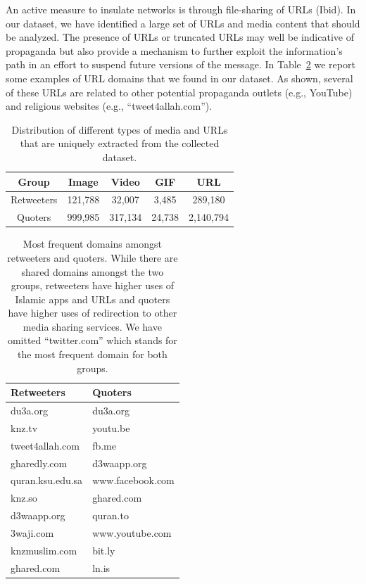 \documentclass[letterpaper]{article} %
\begin{document}
An active measure to insulate networks is through file-sharing of URLs (Ibid). In our  dataset, we have identified a large set of URLs and media content that should be analyzed. The presence of URLs or truncated URLs may well be indicative of propaganda but also provide a mechanism to further exploit the information's path in an effort to suspend future versions of the message.   In Table~\ref{table:urls} we report some examples of URL domains that we found in our dataset. As shown, several of these URLs are related to other potential propaganda outlets (e.g., YouTube) and religious websites (e.g., ``tweet4allah.com'').

\begin{table}[!htbp]
\centering
\begin{tabular}{|c||c|c|c|c|}
 \hline
 Group & Image & Video & GIF & URL \\ [0.5ex]
 \hline\hline
  \rule{0pt}{1ex} Retweeters & 121,788 & 32,007 & 3,485 & 289,180 \\\hline
 Quoters & 999,985 & 317,134 & 24,738 & 2,140,794 \\[0.25ex]\hline
\end{tabular}
\caption{Distribution of different types of media and URLs that are uniquely extracted from the collected dataset.}
\label{table:media-types}
\end{table}


\begin{table}[!h]
\centering
\begin{tabular}{|l||l|}
 \hline
 Retweeters & Quoters \\ [0.5ex]
 \hline\hline
  du3a.org & du3a.org\\
  knz.tv & youtu.be\\
  tweet4allah.com & fb.me\\
  gharedly.com & d3waapp.org\\
  quran.ksu.edu.sa & www.facebook.com\\
  knz.so & ghared.com\\
  d3waapp.org & quran.to\\
  3waji.com & www.youtube.com\\
  knzmuslim.com & bit.ly\\
  ghared.com & ln.is\\
  [0.25ex]\hline
\end{tabular}
\caption{Most frequent domains amongst retweeters and quoters. While there are shared domains amongst the two groups, retweeters have higher uses of Islamic apps and URLs and quoters have higher uses of redirection to other media sharing services. We have omitted ``twitter.com'' which stands for the most frequent domain for both groups.}
\label{table:urls}
\end{table}
\end{document}
